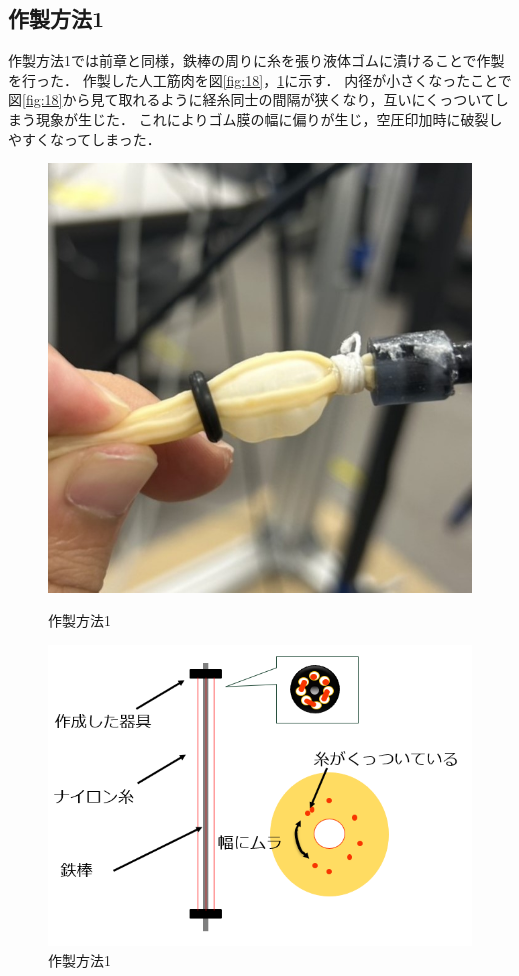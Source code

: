\subsection{作製方法1}
作製方法1では前章と同様，鉄棒の周りに糸を張り液体ゴムに漬けることで作製を行った．
作製した人工筋肉を図\ref{fig:18}，\ref{fig:19}に示す．
内径が小さくなったことで図\ref{fig:18}から見て取れるように経糸同士の間隔が狭くなり，互いにくっついてしまう現象が生じた．
これによりゴム膜の幅に偏りが生じ，空圧印加時に破裂しやすくなってしまった．
\begin{figure}[htbp]
  \centering
  \begin{minipage}{0.49\hsize}
      \centering
      \includegraphics[scale=0.3]{pic/17.jpg}
      \caption{作製方法1}
      \label{fig:18}
  \end{minipage} \hfill
  \begin{minipage}{0.49\hsize}
      \centering
      \includegraphics[scale=0.4]{pic/18.PNG}
      \caption{作製方法1}
      \label{fig:19}
  \end{minipage} 
\end{figure}

